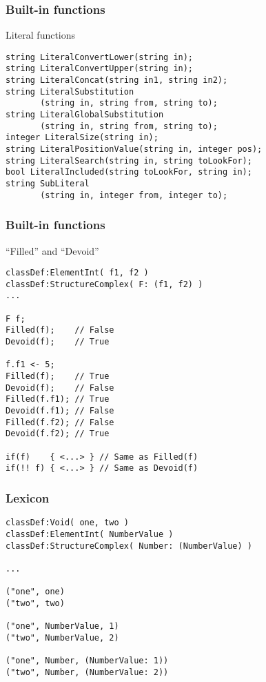 \documentclass[11pt]{beamer}
\begin{document}
\begin{frame}[fragile]
\frametitle{Built-in functions}
\begin{block}{Literal functions}
\footnotesize
\begin{lstlisting}[language=lekta]
string LiteralConvertLower(string in);
string LiteralConvertUpper(string in);
string LiteralConcat(string in1, string in2);
string LiteralSubstitution
       (string in, string from, string to);
string LiteralGlobalSubstitution
       (string in, string from, string to);
integer LiteralSize(string in);
string LiteralPositionValue(string in, integer pos);
string LiteralSearch(string in, string toLookFor);
bool LiteralIncluded(string toLookFor, string in);
string SubLiteral
       (string in, integer from, integer to);
\end{lstlisting}
\end{block}
\end{frame}

\begin{frame}[fragile]
\frametitle{Built-in functions}
\begin{block}{``Filled'' and ``Devoid''}
\scriptsize
\begin{lstlisting}[language=lekta]
classDef:ElementInt( f1, f2 )
classDef:StructureComplex( F: (f1, f2) )
...

F f;
Filled(f);    // False
Devoid(f);    // True

f.f1 <- 5;
Filled(f);    // True
Devoid(f);    // False
Filled(f.f1); // True
Devoid(f.f1); // False
Filled(f.f2); // False
Devoid(f.f2); // True

if(f)    { <...> } // Same as Filled(f)
if(!! f) { <...> } // Same as Devoid(f)
\end{lstlisting}
\end{block}
\end{frame}
\footnotesize
\begin{frame}[fragile]
\frametitle{Lexicon}
\begin{lstlisting}[language=lekta]
classDef:Void( one, two )
classDef:ElementInt( NumberValue )
classDef:StructureComplex( Number: (NumberValue) )

...

("one", one)
("two", two)

("one", NumberValue, 1)
("two", NumberValue, 2)

("one", Number, (NumberValue: 1))
("two", Number, (NumberValue: 2))
\end{lstlisting}
\end{frame}
\end{document}
